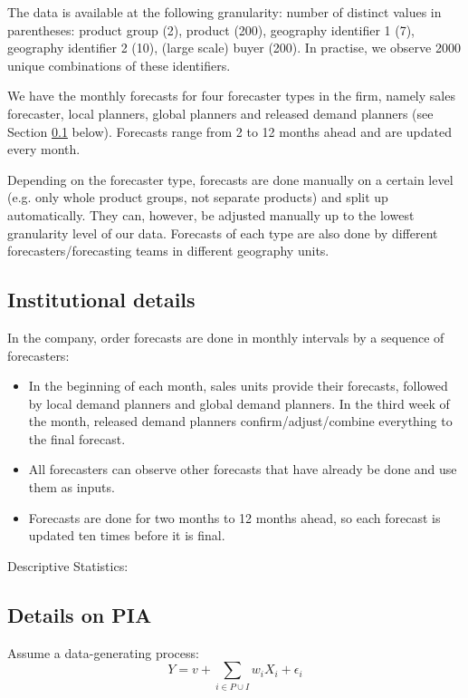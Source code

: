 \documentclass[12pt,a4paper]{article}
\begin{document}
The data is available at the following granularity: number of distinct values in parentheses: product group (2), product (200), geography identifier 1 (7), geography identifier 2 (10), (large scale) buyer (200). In practise, we observe 2000 unique combinations of these identifiers.     

We have the monthly forecasts for four forecaster types in the firm, namely sales forecaster, local planners, global planners and released demand planners (see Section \ref{subsec:institutional_setting} below). Forecasts range from 2 to 12 months ahead and are updated every month.    

Depending on the forecaster type, forecasts are done manually on a certain level (e.g. only whole product groups, not separate products) and split up automatically. They can, however, be adjusted manually up to the lowest granularity level of our data. Forecasts of each type are also done by different forecasters/forecasting teams in different geography units.

\subsection{Institutional details}
\label{subsec:institutional_setting}


In the company, order forecasts are done in monthly intervals by a sequence of forecasters: 

\begin{itemize}
\item In the beginning of each month, sales units provide their forecasts, followed by local demand planners and global demand planners. In the third week of the month, released demand planners confirm/adjust/combine everything to the final forecast.      
\item All forecasters can observe other forecasts that have already be done and use them as inputs. 
\item Forecasts are done for two months to 12 months ahead, so each forecast is updated ten times before it is final.
\end{itemize}

Descriptive Statistics:    




\subsection{Details on PIA}
\label{subsec:pia}

Assume a data-generating process: \[ Y = v + \sum_{i \in P \cup I} w_i X_i + \epsilon_i \]
\end{document}

